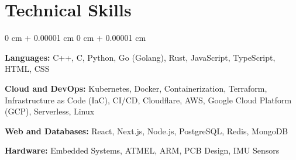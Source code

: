 \documentclass[10pt, a4paper]{article}
\newenvironment{onecolentry}{
    \begin{adjustwidth}{
        0 cm + 0.00001 cm
    }{
        0 cm + 0.00001 cm
    }
}{
    \end{adjustwidth}
} %
\begin{document}
    \section{Technical Skills}

        \begin{onecolentry}
            \textbf{Languages:} C++, C, Python, Go (Golang), Rust, JavaScript, TypeScript, HTML, CSS

            \textbf{Cloud and DevOps:} Kubernetes, Docker, Containerization, Terraform, Infrastructure as Code (IaC), CI/CD, Cloudflare, AWS, Google Cloud Platform (GCP), Serverless, Linux

            \textbf{Web and Databases:} React, Next.js, Node.js, PostgreSQL, Redis, MongoDB

            \textbf{Hardware:} Embedded Systems, ATMEL, ARM, PCB Design, IMU Sensors
        \end{onecolentry}
\end{document}
